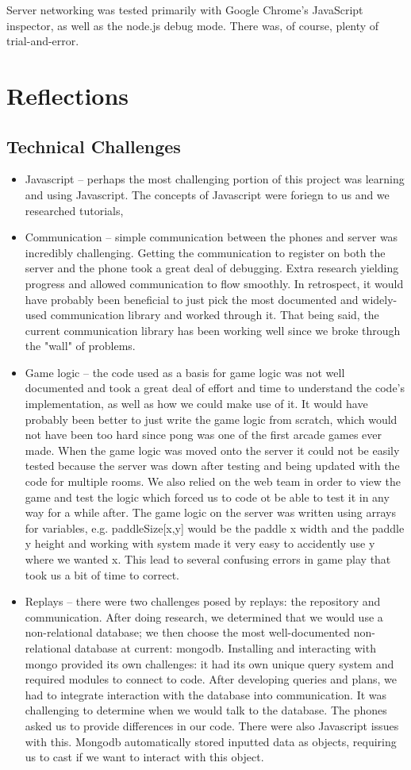 \documentclass[letterpaper,12pt]{article}
\begin{document}
Server networking was tested primarily with Google Chrome’s JavaScript inspector, as well as the node.js debug mode. There was, of course, plenty of trial-and-error.

\section{Reflections}
\subsection{Technical Challenges}
\begin{itemize}
\item Javascript -- perhaps the most challenging portion of this project was learning and using Javascript. The concepts of Javascript were foriegn to us and we researched tutorials, 
\item Communication -- simple communication between the phones and server was incredibly challenging. Getting the communication to register on both the server and the phone took a great deal of debugging. Extra research yielding progress and allowed communication to flow smoothly. In retrospect, it would have probably been beneficial to just pick the most documented and widely-used communication library and worked through it. That being said, the current communication library has been working well since we broke through the "wall" of problems.
\item Game logic -- the code used as a basis for game logic was not well documented and took a great deal of effort and time to understand the code's implementation, as well as how we could make use of it. It would have probably been better to just write the game logic from scratch, which would not have been too hard since pong was one of the first arcade games ever made.  When the game logic was moved onto the server it could not be easily tested because the server was down after testing and being updated with the code for multiple rooms.  We also relied on the web team in order to view the game and test the logic which forced us to code ot be able to test it in any way for a while after.  The game logic on the server was written using arrays for variables, e.g. paddleSize[x,y] would be the paddle x width and the paddle y height and working with system made it very easy to accidently use y where we wanted x. This lead to several confusing errors in game play that took us a bit of time to correct.
\item Replays -- there were two challenges posed by replays: the repository and communication. After doing research, we determined that we would use a non-relational database; we then choose the most well-documented non-relational database at current: mongodb. Installing and interacting with mongo provided its own challenges: it had its own unique query system and required modules to connect to code. After developing queries and plans, we had to integrate interaction with the database into communication. It was challenging to determine when we would talk to the database. The phones asked us to provide differences in our code. There were also Javascript issues with this. Mongodb automatically stored inputted data as objects, requiring us to cast if we want to interact with this object. 


\end{itemize}
\end{document}
